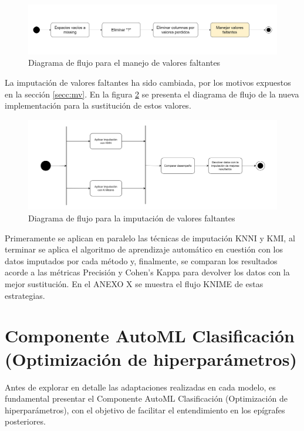 \begin{figure}[H]
	\centering
	\includegraphics[width=1\linewidth]{"figuras/capi 2/preprocesado/valores faltantes.drawio"}
	\caption{Diagrama de flujo para el manejo de valores faltantes}
	\label{fig:valores-faltantes}
\end{figure}

La imputación de valores faltantes ha sido cambiada, por los motivos expuestos en la sección \ref{secc:mv}. En la figura \ref{fig:mv-imputation} se presenta el diagrama de flujo de la nueva implementación para la sustitución de estos valores. 

\begin{figure}[H]
	\centering
	\includegraphics[width=1\linewidth]{"figuras/capi 2/preprocesado/mv imputation"}
	\caption{Diagrama de flujo para la imputación de valores faltantes}
	\label{fig:mv-imputation}
\end{figure}

Primeramente se aplican en paralelo las técnicas de imputación KNNI y KMI, al terminar se aplica el algoritmo de aprendizaje automático en cuestión con los datos imputados por cada método y, finalmente, se comparan los resultados acorde a las métricas Precisión y Cohen's Kappa para devolver los datos con la mejor sustitución. En el ANEXO X se muestra el flujo KNIME de estas estrategias. 



\section{Componente AutoML Clasificación (Optimización de hiperparámetros)}
Antes de explorar en detalle las adaptaciones realizadas en cada modelo, es fundamental presentar el Componente AutoML Clasificación (Optimización de hiperparámetros), con el objetivo de facilitar el entendimiento en los epígrafes posteriores. 

